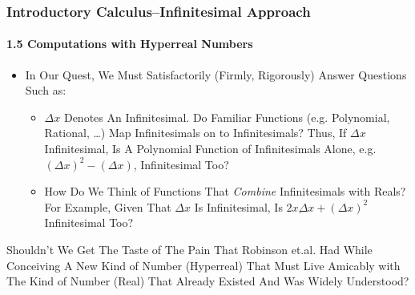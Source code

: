 \begin{frame}
\frametitle{Introductory Calculus--Infinitesimal Approach}
\framesubtitle{1.5 Computations with Hyperreal Numbers}
\label{slide:1.5-02}
\begin{itemize}
\item In Our Quest, We Must Satisfactorily (Firmly, Rigorously) Answer Questions Such as:
\begin{itemize}
\pause\item $\Delta x$ Denotes An Infinitesimal. Do Familiar Functions (e.g. Polynomial, Rational, \dots) Map Infinitesimals on to Infinitesimals? Thus, If $\Delta x$ Infinitesimal, Is A Polynomial Function of Infinitesimals Alone, e.g. $(\Delta x)^2 -(\Delta x)$, Infinitesimal Too?
\pause\item How Do We Think of Functions That \alert{\textit{Combine} Infinitesimals with Reals}? For Example, \alert{Given That $\Delta x$ Is Infinitesimal, Is $\underline{2x\Delta x}+(\Delta x)^2$ Infinitesimal Too}?
\end{itemize}
\end{itemize}
\pause
Shouldn't We Get The Taste of The Pain That Robinson et.al. Had While Conceiving A New Kind of Number (Hyperreal) That Must Live Amicably with The Kind of Number (Real) That Already Existed And Was Widely Understood? 
\end{frame}
